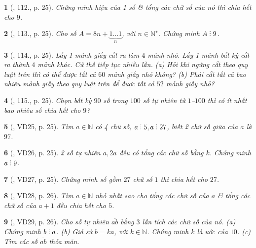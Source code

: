 \documentclass{article}
\newtheorem{baitoan}{}
\DeclareRobustCommand{\divby}{%
	\mathrel{\vbox{\baselineskip.65ex\lineskiplimit0pt\hbox{.}\hbox{.}\hbox{.}}}%
}
\begin{document}
\begin{baitoan}[\cite{Tuyen_Toan_6}, 112., p. 25]
	Chứng minh hiệu của 1 số \& tổng các chữ số của nó thì chia hết cho $9$.
\end{baitoan}

\begin{baitoan}[\cite{Tuyen_Toan_6}, 113., p. 25]
	Cho số $A = 8n + \underbrace{1\ldots1}_n$, với $n\in\mathbb{N}^\star$. Chứng minh $A\divby9$.
\end{baitoan}

\begin{baitoan}[\cite{Tuyen_Toan_6}, 114., p. 25]
	Lấy 1 mảnh giấy cắt ra làm $4$ mảnh nhỏ. Lấy 1 mảnh bất kỳ cắt ra  thành $4$ mảnh khác. Cứ thế tiếp tục nhiều lần. (a) Hỏi khi ngừng cắt theo quy luật trên thì có thể được tất cả $60$ mảnh giấy nhỏ không? (b) Phải cắt tất cả bao nhiêu mảnh giấy theo quy luật trên để được tất cả $52$ mảnh giấy nhỏ?
\end{baitoan}

\begin{baitoan}[\cite{Tuyen_Toan_6}, 115., p. 25]
	Chọn bất kỳ $90$ số trong $100$ số tự nhiên từ $1$--$100$ thì có ít nhất bao nhiêu số chia hết cho $9$?
\end{baitoan}

\begin{baitoan}[\cite{Binh_Toan_6_tap_1}, VD25, p. 25]
	Tìm $a\in\mathbb{N}$ có 4 chữ số, $a\divby5,a\divby27$, biết 2 chữ số giữa của $a$ là $97$.
\end{baitoan}

\begin{baitoan}[\cite{Binh_Toan_6_tap_1}, VD26, p. 25]
	2 số tự nhiên $a,2a$ đều có tổng các chữ số bằng $k$. Chứng minh $a\divby9$.
\end{baitoan}

\begin{baitoan}[\cite{Binh_Toan_6_tap_1}, VD27, p. 25]
	Chứng minh số gồm $27$ chữ số $1$ thì chia hết cho $27$.
\end{baitoan}

\begin{baitoan}[\cite{Binh_Toan_6_tap_1}, VD28, p. 26]
	Tìm $a\in\mathbb{N}$ nhỏ nhất sao cho tổng các chữ số của $a$ \& tổng các chữ số của $a + 1$ đều chia hết cho $5$.
\end{baitoan}

\begin{baitoan}[\cite{Binh_Toan_6_tap_1}, VD29, p. 26]
	Cho số tự nhiên $\overline{ab}$ bằng $3$ lần tích các chữ số của nó. (a) Chứng minh $b\divby a$. (b) Giả sử $b = ka$, với $k\in\mathbb{N}$. Chứng minh $k$ là ước của $10$. (c) Tìm các số $\overline{ab}$ thỏa mãn.
\end{baitoan}
\end{document}
